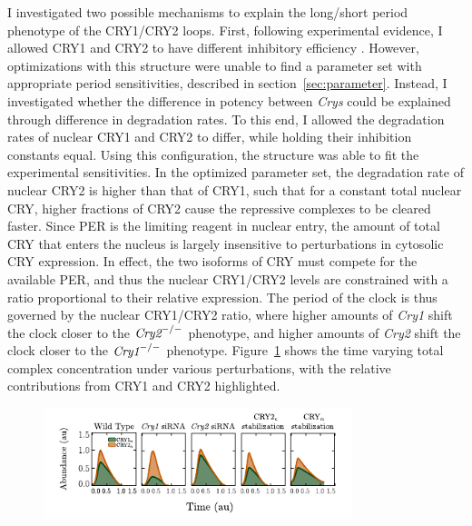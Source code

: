 I investigated two possible mechanisms to explain the long/short period phenotype of the CRY1/CRY2 loops. First, following experimental evidence, I allowed CRY1 and CRY2 to have different inhibitory efficiency \cite{GriffinJr.1999}. However, optimizations with this structure were unable to find a parameter set with appropriate period sensitivities, described in section~\ref{sec:parameter}. Instead, I investigated whether the difference in potency between {\it Crys} could be explained through difference in degradation rates. To this end, I allowed the degradation rates of nuclear CRY1 and CRY2 to differ, while holding their inhibition constants equal. Using this configuration, the structure was able to fit the experimental sensitivities. In the optimized parameter set, the degradation rate of nuclear CRY2 is higher than that of CRY1, such that for a constant total nuclear CRY, higher fractions of CRY2 cause the repressive complexes to be cleared faster. Since PER is the limiting reagent in nuclear entry, the amount of total CRY that enters the nucleus is largely insensitive to perturbations in cytosolic CRY expression. In effect, the two isoforms of CRY must compete for the available PER, and thus the nuclear CRY1/CRY2 levels are constrained with a ratio proportional to their relative expression. The period of the clock is thus governed by the nuclear CRY1/CRY2 ratio, where higher amounts of {\it Cry1} shift the clock closer to the $\text{\it Cry2}^{-/-}$ phenotype, and higher amounts of {\it Cry2} shift the clock closer to the $\text{\it Cry1}^{-/-}$ phenotype. Figure~\ref{fig:nucleartimecourse} shows the time varying total complex concentration under various perturbations, with the relative contributions from CRY1 and CRY2 highlighted.

\begin{figure}[bt]
  \centering
  \begin{minipage}{0.9\textwidth}
    \centering
    \includegraphics[width=0.8\textwidth]{chap2/figures/nucleartimecourse.pdf}
    \label{fig:nucleartimecourse}
  \end{minipage}
\end{figure}

